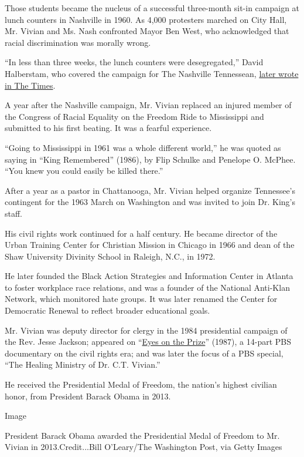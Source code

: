 Those students became the nucleus of a successful three-month sit-in
campaign at lunch counters in Nashville in 1960. As 4,000 protesters
marched on City Hall, Mr. Vivian and Ms. Nash confronted Mayor Ben West,
who acknowledged that racial discrimination was morally wrong.

``In less than three weeks, the lunch counters were desegregated,''
David Halberstam, who covered the campaign for The Nashville Tennessean,
\href{https://www.nytimes3xbfgragh.onion/1995/05/01/opinion/nashville-revisited-lunchcounter-days.html}{later
wrote in The Times}.

A year after the Nashville campaign, Mr. Vivian replaced an injured
member of the Congress of Racial Equality on the Freedom Ride to
Mississippi and submitted to his first beating. It was a fearful
experience.

``Going to Mississippi in 1961 was a whole different world,'' he was
quoted as saying in ``King Remembered'' (1986), by Flip Schulke and
Penelope O. McPhee. ``You knew you could easily be killed there.''

After a year as a pastor in Chattanooga, Mr. Vivian helped organize
Tennessee's contingent for the 1963 March on Washington and was invited
to join Dr. King's staff.

His civil rights work continued for a half century. He became director
of the Urban Training Center for Christian Mission in Chicago in 1966
and dean of the Shaw University Divinity School in Raleigh, N.C., in
1972.

He later founded the Black Action Strategies and Information Center in
Atlanta to foster workplace race relations, and was a founder of the
National Anti-Klan Network, which monitored hate groups. It was later
renamed the Center for Democratic Renewal to reflect broader educational
goals.

Mr. Vivian was deputy director for clergy in the 1984 presidential
campaign of the Rev. Jesse Jackson; appeared on
``\href{https://americanarchive.org/catalog/cpb-aacip_151-z892806203}{Eyes
on the Prize}'' (1987), a 14-part PBS documentary on the civil rights
era; and was later the focus of a PBS special, ``The Healing Ministry of
Dr. C.T. Vivian.''

He received the Presidential Medal of Freedom, the nation's highest
civilian honor, from President Barack Obama in 2013.

Image

President Barack Obama awarded the Presidential Medal of Freedom to Mr.
Vivian in 2013.Credit...Bill O'Leary/The Washington Post, via Getty
Images

